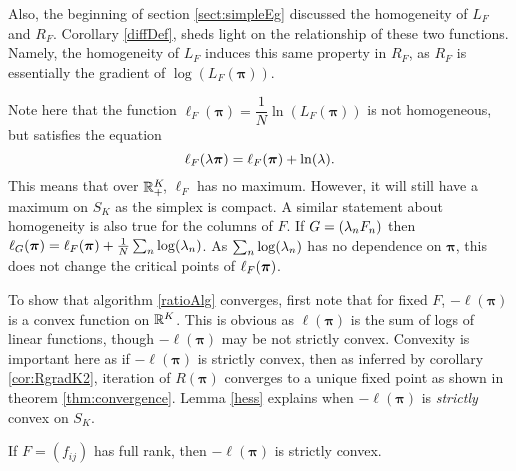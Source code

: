 Also, the beginning of section \ref{sect:simpleEg} discussed the homogeneity of \( L_F \) and \( R_F \).  Corollary \ref{diffDef}, sheds light on the relationship of these two functions. Namely, the homogeneity of \( L_F \) induces this same property in \( R_F \), as \( R_F \) is essentially the gradient of \(\log(L_F(\bm\pi)) \).  

Note here that the function \( \ell_F(\bm\pi) = \dfrac{1}{N} \ln(L_F(\bm\pi))\) is not homogeneous, but satisfies the equation
\begin{equation}\label{eqn:ellScaling}
\ell_F(\lambda\bm\pi) = \ell_F(\bm\pi)+\ln(\lambda).
\end{equation}
This means that over \( \mathbb R^K_{+}\! \), \( \ell_F \) has no maximum. However, it will still have a maximum on \( S_K \) as the simplex is compact. A similar statement about homogeneity is also true for the columns of \( F \). If \( G =(\lambda_n F_n) \) then \( \ell_{G}({\bm\pi}) = \ell_{F}({\bm\pi})+\frac 1N\sum_n \log(\lambda_n) \). As \( \sum_n \log(\lambda_n) \) has no dependence on \( \bm\pi \), this does not change the critical points of \( \ell_{F}({\bm\pi}) \).


To show that algorithm \ref{ratioAlg} converges, first note that for fixed \( F \), $-\ell(\bm\pi)$ is a convex function on $\mathbb R^K$.  This is obvious as $\ell(\bm\pi)$ is the sum of logs of linear functions, though \( -\ell(\bm\pi) \) may be not strictly convex. Convexity is important here as if \( -\ell(\bm\pi) \) is strictly convex, then as inferred by corollary \ref{cor:RgradK2}, iteration of \( R(\bm\pi) \) converges to a unique fixed point as shown in theorem \ref{thm:convergence}. Lemma \ref{hess} explains when $-\ell(\bm\pi)$ is \textit{strictly} convex on \( S_K \).


\begin{lemm}\label{hess}
If $F=(f_{ij})$ has full rank, then $-\ell(\bm\pi)$ is strictly convex.
\end{lemm}		

